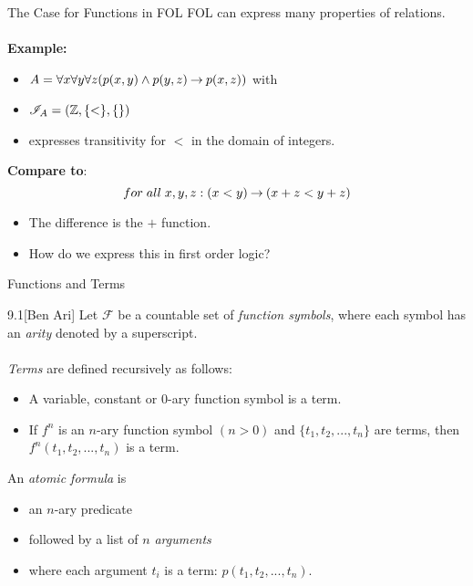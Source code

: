 \begin{slide}[bm=,toc=]{The Case for Functions in FOL}
FOL can express many properties of relations. 
\\~\\
\pause
{\bf Example:}
\begin{itemize}
\item $A = \forall x \forall y \forall z (p(x,y) \land p (y,z) \mathbin{\rightarrow} p(x,z))$ with
\item $\mathcal{I}_A = (\mathbb{Z},\{<\},\{\})$
\item expresses transitivity for $<$ in the domain of integers.
\end{itemize}
\vspace{2ex}
\pause
{\bf Compare to}:
\[
  for\; all\;  x,y,z: (x < y) \mathbin{\rightarrow} (x + z < y + z)
  \]

\vspace{-1ex}
\pause
\begin{itemize}
\item The difference is the $+$ function.
\item How do we express this in first order logic?
\end{itemize}

\end{slide}

\begin{wideslide}[bm=,toc=]{Functions and Terms}
\begin{defn}{9.1}[Ben Ari]
Let $\mathcal{F}$ be a countable set of \emph{function symbols}, where
each symbol has an \emph{arity} denoted by a superscript. 
\\~\\
\pause
\emph{Terms} are defined recursively as follows:
\end{defn}
\vspace{-2ex}
\begin{itemize}
\item<3-> A variable, constant or $0$-ary function symbol is a term.
\item<4-> If $f^n$ is an $n$-ary function symbol $(n > 0)$ and $\{t_1,t_2,...,t_n\}$
are terms, then $f^n(t_1,t_2,...,t_n)$ is a term.
\end{itemize}
\pause[3]
An \emph{atomic formula} is 
\begin{itemize}
\item<6-> an $n$-ary predicate 
\item<7-> followed by a list of $n$ \emph{arguments} 
\item<8-> where each argument $t_i$ is a term: $p(t_1,t_2,...,t_n)$.
\end{itemize}
\end{wideslide}

